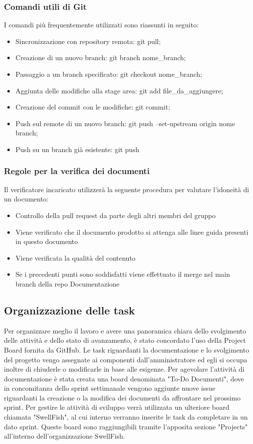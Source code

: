 \documentclass[12pt]{article}
\begin{document}
\subsubsection{Comandi utili di Git}
I comandi più frequentemente utilizzati sono riassunti in seguito:
\begin{itemize}
    \item Sincronizzazione con repository remota: git pull;
    \item Creazione di un nuovo branch: git branch nome\_branch;
    \item Passaggio a un branch specificato: git checkout nome\_branch;
    \item Aggiunta delle modifiche alla stage area: git add file\_da\_aggiungere;
    \item Creazione del commit con le modifiche: git commit;
    \item Push sul remote di un nuovo branch: git push --set-upstream origin nome branch;
    \item Push su un branch già esistente: git push
\end{itemize}
\subsubsection{Regole per la verifica dei documenti}
Il verificatore incaricato utilizzerà la seguente procedura per valutare l'idoneità di un documento:
\begin{itemize}
    \item Controllo della pull request da parte degli altri membri del gruppo
    \item Viene verificato che il documento prodotto si attenga alle linee guida presenti in questo documento
    \item Viene verificata la qualità del contenuto 
    \item Se i precedenti punti sono soddisfatti viene effettuato il merge nel main branch della repo Documentazione
\end{itemize}
\subsection{Organizzazione delle task}
Per organizzare meglio il lavoro e avere una panoramica chiara dello svolgimento delle attività e dello stato di avanzamento, è stato concordato l'uso della Project Board fornita da GitHub.
Le task riguardanti la documentazione e lo svolgimento del progetto vengo assegnate ai componenti dall'amministratore ed egli si occupa inoltre di chiuderle o modificarle in base alle esigenze.
Per agevolare l'attività di documentazione è stata creata una board denominata "To-Do Documenti", dove in concomitanza dello sprint settimanale vengono aggiunte nuove issue riguardanti la creazione o la modifica dei documenti da affrontare nel prossimo sprint.
Per gestire le attività di sviluppo verrà utilizzata un ulteriore board chiamata "SwellFish", al cui interno verranno inserite le task da completare in un dato sprint.
Queste board sono raggiungibili tramite l'apposita sezione "Projects" all'interno dell'organizzazione SwellFish.
\end{document}
